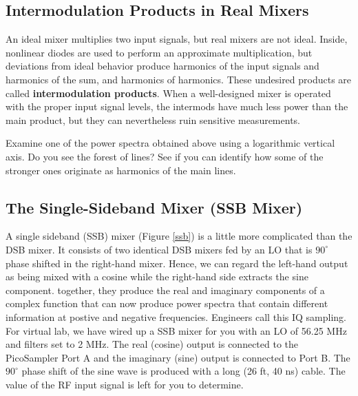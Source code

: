 \documentclass[11pt,preprint]{aastex}
\begin{document}
\subsection{Intermodulation Products in Real Mixers}

\noindent
An ideal mixer multiplies two input
signals, but real mixers are not ideal. Inside,
nonlinear diodes are used to perform an approximate multiplication, but
deviations from ideal behavior 
produce harmonics of the input signals and harmonics of the sum, and harmonics
of harmonics.
These undesired products are called
{\bf intermodulation products}.
When a well-designed
mixer is operated with the proper input signal levels, the intermods
have much less power than the main product, but they can nevertheless
ruin sensitive measurements.

Examine one of the power spectra obtained above using a logarithmic vertical
axis.
Do you see the forest of lines?
See if you can identify how some of the
stronger ones originate as harmonics of the main lines.

\subsection{ The Single-Sideband Mixer (SSB Mixer)}
\label{sectssb}

\noindent
A single sideband (SSB) mixer (Figure \ref{ssb}) is a
little more complicated than the DSB mixer. It consists of two identical
DSB mixers fed by an LO that is $90^\circ$ phase shifted in the right-hand mixer.
Hence, we can regard the left-hand output as being mixed with a cosine while
the right-hand side extracts the sine component.
together, they produce the real and imaginary components of a complex function
that can now produce power spectra that contain different information
at postive and negative frequencies.
Engineers call this IQ sampling.
{\color{red} For virtual lab, we have wired up a SSB mixer for you with an LO of 56.25 MHz and
filters set to 2 MHz. The real (cosine) output is connected to the PicoSampler Port A and the
imaginary (sine) output is connected to Port B. The $90^\circ$ phase shift of the sine wave
is produced with a long (26 ft, 40 ns) cable. The value of the RF input signal
is left for you to determine.}
\end{document}
